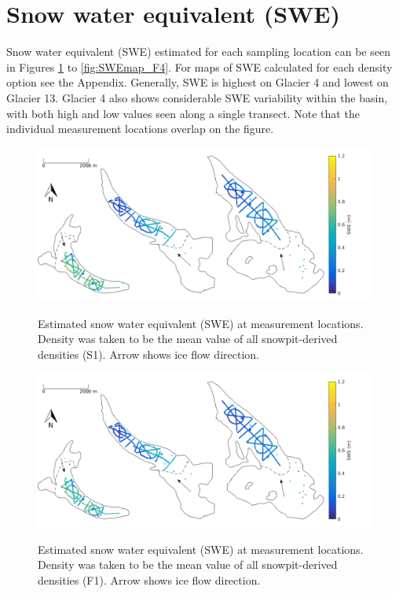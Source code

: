 \documentclass[12pt]{article}
\begin{document}
\pagebreak
\section{Snow water equivalent (SWE)}

Snow water equivalent (SWE) estimated for each sampling location can be seen in Figures  \ref{fig:SWEmap_S1} to \ref{fig:SWEmap_F4}. For maps of SWE calculated for each density option see the Appendix. Generally, SWE is highest on Glacier 4 and lowest on Glacier 13. Glacier 4 also shows considerable SWE variability within the basin, with both high and low values seen along a single transect. Note that the individual measurement locations overlap on the figure.

\begin{figure}[H]
	\centering
	\includegraphics[width = \textwidth]{SWEmap_opt2.png}\\
	\caption{Estimated snow water equivalent (SWE) at measurement locations. Density was taken to be the mean value of all snowpit-derived densities (S1). Arrow shows ice flow direction.}
	\label{fig:SWEmap_S1}
\end{figure}

\begin{figure}[H]
	\centering
	\includegraphics[width = \textwidth]{SWEmap_opt3.png}\\
	\caption{Estimated snow water equivalent (SWE) at measurement locations. Density was taken to be the mean value of all snowpit-derived densities (F1). Arrow shows ice flow direction.}
	\label{fig:SWEmap_F1}
\end{figure}
\end{document}
